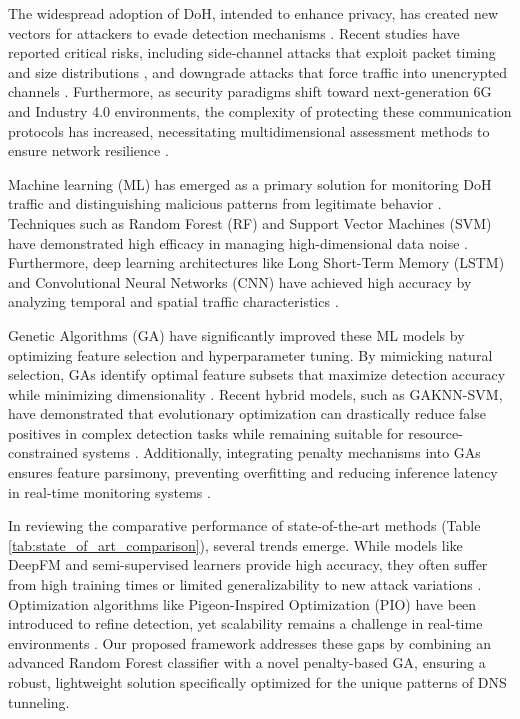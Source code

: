 \documentclass[journal]{IAENGtran}
\begin{document}
The widespread adoption of DoH, intended to enhance privacy, has created new vectors for attackers to evade detection mechanisms \cite{hynek2022summary}. Recent studies have reported critical risks, including side-channel attacks that exploit packet timing and size distributions \cite{kim2025reinforcement}, and downgrade attacks that force traffic into unencrypted channels \cite{afek2025pops}. Furthermore, as security paradigms shift toward next-generation 6G and Industry 4.0 environments, the complexity of protecting these communication protocols has increased, necessitating multidimensional assessment methods to ensure network resilience \cite{li2025harnessing}.

Machine learning (ML) has emerged as a primary solution for monitoring DoH traffic and distinguishing malicious patterns from legitimate behavior \cite{alzighaibi2023detection}. Techniques such as Random Forest (RF) and Support Vector Machines (SVM) have demonstrated high efficacy in managing high-dimensional data noise \cite{elkhadir2024enhancing, aggarwal2024ensemble}. Furthermore, deep learning architectures like Long Short-Term Memory (LSTM) and Convolutional Neural Networks (CNN) have achieved high accuracy by analyzing temporal and spatial traffic characteristics \cite{bozkurt2024new, boonyopakorn2024malicious}.

Genetic Algorithms (GA) have significantly improved these ML models by optimizing feature selection and hyperparameter tuning. By mimicking natural selection, GAs identify optimal feature subsets that maximize detection accuracy while minimizing dimensionality \cite{roopesh2024review, singh2025optimizing}. Recent hybrid models, such as GAKNN-SVM, have demonstrated that evolutionary optimization can drastically reduce false positives in complex detection tasks while remaining suitable for resource-constrained systems \cite{alemu2025genetic}. Additionally, integrating penalty mechanisms into GAs ensures feature parsimony, preventing overfitting and reducing inference latency in real-time monitoring systems \cite{alsajri2024intrusion, halim2021effective}.



In reviewing the comparative performance of state-of-the-art methods (Table \ref{tab:state_of_art_comparison}), several trends emerge. While models like DeepFM and semi-supervised learners provide high accuracy, they often suffer from high training times or limited generalizability to new attack variations \cite{jha2024doh, nguyen2024semi}. Optimization algorithms like Pigeon-Inspired Optimization (PIO) have been introduced to refine detection, yet scalability remains a challenge in real-time environments \cite{abualghanam2024pigeon}. Our proposed framework addresses these gaps by combining an advanced Random Forest classifier with a novel penalty-based GA, ensuring a robust, lightweight solution specifically optimized for the unique patterns of DNS tunneling.
\end{document}
